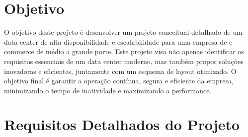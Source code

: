 \documentclass[
	12pt,				%
	oneside,			%
	a4paper,			%
	english,			%
	brazil				%
	]{abntex2unama}
\begin{document}
\frenchspacing


%
% 
%
\imprimircapa

\tableofcontents*
\cleardoublepage



\textual



% 
%
%
\chapter{Objetivo}
O objetivo deste projeto é desenvolver um projeto conceitual detalhado de um data center de alta disponibilidade e escalabilidade para uma empresa de e-commerce de médio a grande porte. Este projeto visa não apenas identificar os requisitos essenciais de um data center moderno, mas também propor soluções inovadoras e eficientes, juntamente com um esquema de layout otimizado. O objetivo final é garantir a operação contínua, segura e eficiente da empresa, minimizando o tempo de inatividade e maximizando a performance.

\chapter{Requisitos Detalhados do Projeto}
\end{document}

